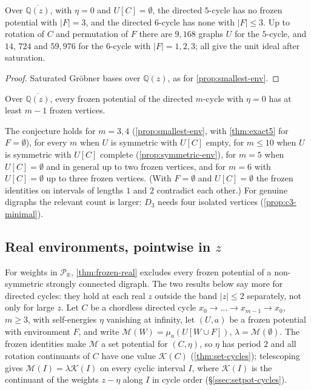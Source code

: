 \documentclass[final]{siamart0516}
\numberwithin{theorem}{section}
\numberwithin{equation}{section}
\theoremstyle{siamnonum}
\theoremstyle{plain}
\newcommand{\QQ}{\mathbb{Q}}
\newcommand{\RR}{\mathbb{R}}
\newcommand{\Qz}{\QQ(z)}
\newcommand{\Qzbar}{\overline{\QQ(z)}}
\newcommand{\Puis}{\mathcal{P}_{\RR}}
\newcommand{\Mpot}{\mathcal{M}}           %
\newcommand{\cont}{\mathcal{K}}           %
\begin{document}
\begin{proposition}\label{prop:c5c6}
Over $\Qzbar$, with $\eta=0$ and $U[C]=\emptyset$, the directed $5$-cycle has no frozen potential with $|F|=3$, and the directed $6$-cycle has none with $|F|\le3$. Up to rotation of $C$ and permutation of $F$ there are $9{,}168$ graphs $U$ for the $5$-cycle, and $14$, $724$ and $59{,}976$ for the $6$-cycle with $|F|=1,2,3$; all give the unit ideal after saturation.
\end{proposition}
\begin{proof}
Saturated Gr\"obner bases over $\Qz$, as for \cref{prop:smallest-env}.
\end{proof}

\begin{conjecture}\label{conj:minimal-env}
Over $\Qzbar$, every frozen potential of the directed $m$-cycle with $\eta=0$ has at least $m-1$ frozen vertices.
\end{conjecture}

The conjecture holds for $m=3,4$ (\cref{prop:smallest-env}, with \cref{thm:exact5} for $F=\emptyset$), for every $m$ when $U$ is symmetric with $U[C]$ empty, for $m\le10$ when $U$ is symmetric with $U[C]$ complete (\cref{prop:symmetric-env}), for $m=5$ when $U[C]=\emptyset$ and in general up to two frozen vertices, and for $m=6$ with $U[C]=\emptyset$ up to three frozen vertices. (With $F=\emptyset$ and $U[C]=\emptyset$ the frozen identities on intervals of lengths $1$ and $2$ contradict each other.) For genuine digraphs the relevant count is larger: $D_3$ needs four isolated vertices (\cref{prop:c3-minimal}).

\subsection{Real environments, pointwise in \texorpdfstring{$z$}{z}}
For weights in $\Puis$, \cref{thm:frozen-real} excludes every frozen potential of a non-symmetric strongly connected digraph. The two results below say more for directed cycles: they hold at each real $z$ outside the band $|z|\le2$ separately, not only for large $z$. Let $C$ be a chordless directed cycle $x_0\to\dots\to x_{m-1}\to x_0$, $m\ge3$, with self-energies $\eta$ vanishing at infinity, let $(U,a)$ be a frozen potential with environment $F$, and write $\Mpot(W)=\mu_a(U[W\cup F])$, $\lambda=\Mpot(\emptyset)$. The frozen identities make $\Mpot$ a set potential for $(C,\eta)$, so $\eta$ has period $2$ and all rotation continuants of $C$ have one value $\cont(C)$ (\cref{thm:set-cycles}); telescoping gives $\Mpot(I)=\lambda\cont(I)$ on every cyclic interval $I$, where $\cont(I)$ is the continuant of the weights $z-\eta$ along $I$ in cycle order (\S\ref{ssec:setpot-cycles}).
\end{document}
